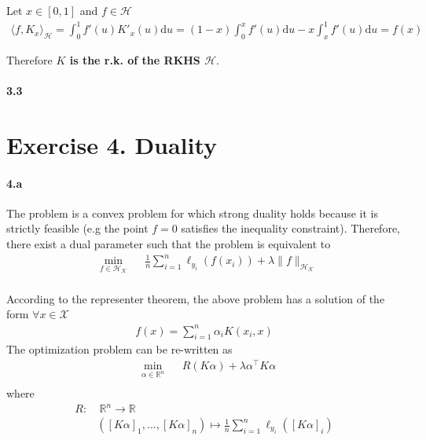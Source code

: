 \documentclass[10pt]{article}
\begin{document}
    Let $x\in[0, 1]$ and $f\in \mathcal{H}$
    \begin{align*}
        \langle f, K_x \rangle_\mathcal{H} = \int_0^1 f'(u)K'_x(u)\text{d}u = 
        (1-x)\int_0^x f'(u)\text{d}u - x \int_x^1 f'(u)\text{d}u = f(x)
    \end{align*}

    Therefore \textbf{$K$ is the r.k. of the RKHS $\mathcal{H}$}.

    \paragraph{3.3} 

    \section*{Exercise 4. Duality}
    \paragraph{4.a} The problem is a convex problem for which strong duality 
    holds because it is strictly feasible (e.g the point $f=0$ satisfies the
    inequality constraint). Therefore, there exist a dual parameter such that
    the problem is equivalent to 
    \begin{equation*}
        \begin{aligned}
        & \underset{f\in\mathcal{H}_\mathcal{K}}{\text{min}}
        & & \frac{1}{n}\sum_{i=1}^n \ell_{y_i}(f(x_i)) + \lambda \lVert f
        \rVert_{\mathcal{H}_\mathcal{K}}\\
        \end{aligned}
    \end{equation*}

    According to the representer theorem, the above problem has a solution of
    the form $\forall x\in \mathcal{X}$
    \begin{align*}
        f(x) = \sum_{i=1}^n \alpha_i K(x_i, x)
    \end{align*}
    The optimization problem can be re-written as 
    \begin{equation*}
        \begin{aligned}
        & \underset{\alpha\in\mathbb{R}^n}{\text{min}}
        & & R(K\alpha) + \lambda \alpha^\top K \alpha\\
        \end{aligned}
    \end{equation*} 
    where 
    \begin{align*}
        R:& \ \mathbb{R}^n \rightarrow \mathbb{R}\\
        & ([K\alpha]_1, ..., [K\alpha]_n) \mapsto \frac{1}{n}\sum_{i=1}^n
        \ell_{y_i}([K\alpha]_i)
    \end{align*}
\end{document}

